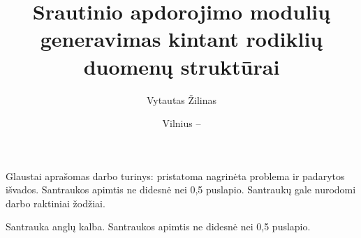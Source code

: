 \documentclass{VUMIFPSbakalaurinis}
\title{Srautinio apdorojimo modulių generavimas kintant rodiklių duomenų struktūrai}
\author{Vytautas Žilinas}
\date{Vilnius – \the\year}
\begin{document}
 
\maketitle

\cleardoublepage{}
\setcounter{page}{2}

Glaustai aprašomas darbo turinys: pristatoma nagrinėta problema ir padarytos
išvados. Santraukos apimtis ne didesnė nei 0,5 puslapio. Santraukų gale
nurodomi darbo raktiniai žodžiai. 

Santrauka anglų kalba. Santraukos apimtis ne didesnė nei 0,5 puslapio.

\tableofcontents

 
\end{document}
